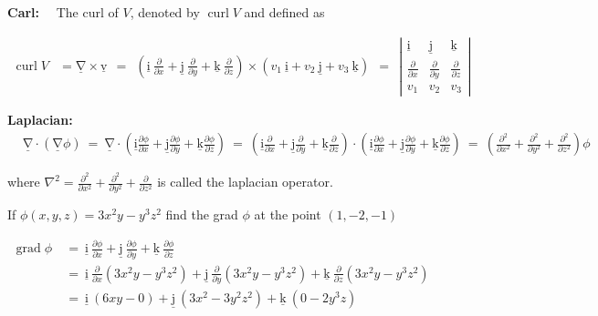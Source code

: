 \documentclass[12pt]{article}
\renewcommand{\vec}[1]{\underline{\mathrm{#1}}}
\begin{document}
\vspace{2ex}
\textbf{Carl:} \ \ 
The curl of $V$, denoted by $\operatorname{curl} V$ and defined as

\vspace{0.5ex}
$\begin{aligned}
\operatorname{curl} V & =\vec{\nabla} \times \vec{v}
\ \ = \ \ \left(\vec{i} \ \frac{\partial}{\partial x}+\vec{j} \ \frac{\partial}{\partial y}+\vec{k} \ \frac{\partial}{\partial z}\right) \times\left(v_1 \ \vec{i}+v_2 \ \vec{j}+v_3 \ \vec{k}\right)
\ \ = \ \ \left|\begin{array}{ccc}
\vec{i} & \vec{j} & \vec{k} \\[1ex]
\frac{\partial}{\partial x} & \frac{\partial}{\partial y} & \frac{\partial}{\partial z} \\
v_1 & v_2 & v_3
\end{array}\right|
\end{aligned}$

\textbf{Laplacian:} \ \ 
$\begin{aligned}
& \vec{\nabla} \cdot(\vec{\nabla} \phi)
\ = \ \vec{\nabla} \cdot \left(\vec{i} \frac{\partial \phi}{\partial x}+\vec{j} \frac{\partial \phi}{\partial y}+\vec{k} \frac{\partial \phi}{\partial z}\right)
\ = \ \left(\vec{i} \frac{\partial}{\partial x}+\vec{j} \frac{\partial}{\partial y}+\vec{k} \frac{\partial}{\partial z}\right) \cdot \left(\vec{i} \frac{\partial \phi}{\partial x}+\vec{j} \frac{\partial \phi}{\partial y}+\vec{k} \frac{\partial \phi}{\partial z}\right)
\ = \ \left(\frac{\partial^2}{\partial x^2}+\frac{\partial^2}{\partial y^2}+\frac{\partial^2}{\partial z^2}\right) \phi
\end{aligned}$

\vspace{1ex}
where $\nabla^2=\frac{\partial^2}{\partial x^2}+\frac{\partial^2}{\partial y^2}+\frac{\partial}{\partial z^2}$ is called the laplacian operator.

\pagebreak
\textbf{} If $\phi(x, y, z)=3 x^2 y-y^3 z^2$ find the grad $\phi$ at the point $(1,-2,-1)$

\Heading{Solution:}
\vspace{2ex}
$\begin{aligned}
\operatorname{grad} \phi \ &= \
\vec{i} \ \frac{\partial \phi}{\partial x} +
\vec{j} \ \frac{\partial \phi}{\partial y} +
\vec{k} \ \frac{\partial \phi}{\partial z} \\
\ &= \
\vec{i} \ \frac{\partial}{\partial x}\left(3 x^2 y-y^3 z^2\right) + 
\vec{j} \ \frac{\partial}{\partial y}\left(3 x^2 y-y^3 z^2\right) +
\vec{k} \ \frac{\partial}{\partial z}\left(3 x^2 y-y^3 z^2\right) \\
\ &= \
\vec{i} \ (6xy-0) +
\vec{j} \ \left(3x^2-3y^2z^2\right) +
\vec{k} \ \left(0-2y^3z\right)
\end{aligned}$
\end{document}
